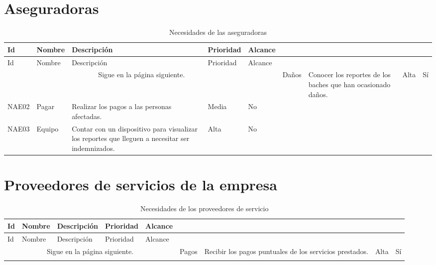\section {Aseguradoras}
\begin{longtable}{|m{1.5cm}|m{3cm}|m{5cm}|m{2cm}| m{2cm}|}\rowcolor[HTML]{3531FF} 
        {\color[HTML]{FFFFFF} Id} &{\color[HTML]{FFFFFF}Nombre} & {\color[HTML]{FFFFFF} Descripción} & {\color[HTML]{FFFFFF}Prioridad} & {\color[HTML]{FFFFFF}Alcance}\\
        \hline
        \endfirsthead
        \hline
        Id & Nombre & Descripción & Prioridad & Alcance  \\
        \hline 
        \endhead
        \multicolumn{5}{c}{Sigue en la página siguiente.}
        \endfoot
        \endlastfoot
        
        NAE01 & Daños & Conocer los reportes de los baches que han ocasionado daños.& Alta  & Sí \\ \hline
        
        NAE02 & Pagar & Realizar los pagos a las personas afectadas. & Media & No \\\hline
        
        NAE03 & Equipo & Contar con un dispositivo para visualizar los reportes que lleguen a necesitar ser indemnizados. & Alta & No
        \hline
    \caption{Necesidades de las aseguradoras}
    \label{tab:NAEs}
\end{longtable}

\section {Proveedores de servicios de la empresa}
\begin{longtable}{|m{1.5cm}|m{3cm}|m{5cm}|m{2cm}| m{2cm}|}\rowcolor[HTML]{3531FF} 
        {\color[HTML]{FFFFFF} Id} &{\color[HTML]{FFFFFF}Nombre} & {\color[HTML]{FFFFFF} Descripción} & {\color[HTML]{FFFFFF}Prioridad} & {\color[HTML]{FFFFFF}Alcance}\\
        \hline
        \endfirsthead
        \hline
        Id & Nombre & Descripción & Prioridad & Alcance  \\
        \hline 
        \endhead
        \multicolumn{5}{c}{Sigue en la página siguiente.}
        \endfoot
        \endlastfoot
        
        NPDS01 & Pagos & Recibir los pagos puntuales de los servicios prestados. & Alta & Sí \\
        \hline
    \caption{Necesidades de los proveedores de servicio}
    \label{tab:NPSS}
\end{longtable}